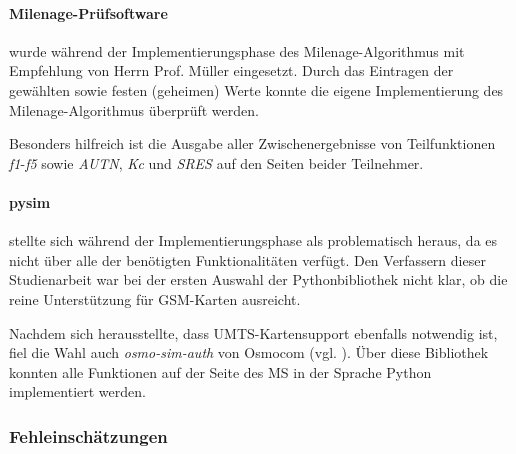			\paragraph{Milenage-Prüfsoftware} wurde während der Implementierungsphase des
			Milenage-Algorithmus mit Empfehlung von Herrn Prof. Müller eingesetzt.
			Durch das Eintragen der gewählten sowie festen (geheimen) Werte konnte
			die eigene Implementierung des Milenage-Algorithmus überprüft werden.

			Besonders hilfreich ist die Ausgabe aller Zwischenergebnisse von Teilfunktionen
			\textit{f1}-\textit{f5} sowie \textit{AUTN}, \textit{Kc} und \textit{SRES} auf
			den Seiten beider Teilnehmer.

			\paragraph{pysim} stellte sich während der Implementierungsphase als
			problematisch heraus, da es nicht über alle der benötigten Funktionalitäten
			verfügt. Den Verfassern dieser Studienarbeit war bei der ersten Auswahl
			der Pythonbibliothek nicht klar, ob die reine Unterstützung für \ac{GSM}-Karten
			ausreicht.

			Nachdem sich herausstellte, dass \ac{UMTS}-Kartensupport ebenfalls notwendig ist, fiel die
			Wahl auch \textit{osmo-sim-auth} von Osmocom (vgl. ). Über diese Bibliothek konnten
			alle Funktionen auf der Seite des \ac{MS} in der Sprache Python implementiert werden.
		\subsubsection{Fehleinschätzungen}
\clearpage